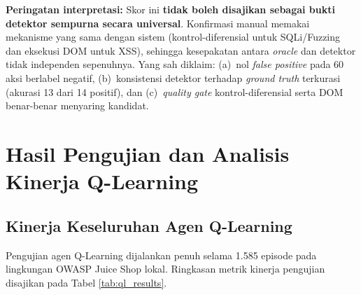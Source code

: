 \textbf{Peringatan interpretasi:} Skor ini \textbf{tidak boleh disajikan sebagai bukti detektor sempurna secara universal}. Konfirmasi manual memakai mekanisme yang sama dengan sistem (kontrol-diferensial untuk SQLi/Fuzzing dan eksekusi DOM untuk XSS), sehingga kesepakatan antara \textit{oracle} dan detektor tidak independen sepenuhnya. Yang sah diklaim: (a)~nol \textit{false positive} pada 60 aksi berlabel negatif, (b)~konsistensi detektor terhadap \textit{ground truth} terkurasi (akurasi 13 dari 14 positif), dan (c)~\textit{quality gate} kontrol-diferensial serta DOM benar-benar menyaring kandidat.


\section{Hasil Pengujian dan Analisis Kinerja Q-Learning}

\subsection{Kinerja Keseluruhan Agen Q-Learning}

Pengujian agen Q-Learning dijalankan penuh selama 1.585 episode pada lingkungan OWASP Juice Shop lokal. Ringkasan metrik kinerja pengujian disajikan pada Tabel \ref{tab:ql_results}.

